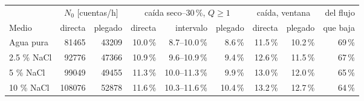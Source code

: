 \begin{tabular}{l rr rrr rr r}
\toprule
 & \multicolumn{2}{c}{$N_0$ [cuentas/h]} & \multicolumn{3}{c}{caída seco--30\,\%, $Q\ge1$} & \multicolumn{2}{c}{caída, ventana} & del flujo \\
\cmidrule(lr){2-3}\cmidrule(lr){4-6}\cmidrule(lr){7-8}
Medio & directa & plegado & directa & intervalo & plegado & directa & plegado & que baja \\
\midrule
Agua pura & 81465 & 43209 & 10.0\,\% & 8.7--10.0\,\% & 8.6\,\% & 11.5\,\% & 10.2\,\% & 69\,\% \\
2.5 \% NaCl & 92776 & 47366 & 10.9\,\% & 9.6--10.9\,\% & 9.4\,\% & 12.6\,\% & 11.5\,\% & 67\,\% \\
5 \% NaCl & 99049 & 49455 & 11.3\,\% & 10.0--11.3\,\% & 9.9\,\% & 13.0\,\% & 12.0\,\% & 65\,\% \\
10 \% NaCl & 108076 & 52878 & 11.6\,\% & 10.3--11.6\,\% & 10.4\,\% & 13.2\,\% & 12.7\,\% & 64\,\% \\
\bottomrule
\end{tabular}

